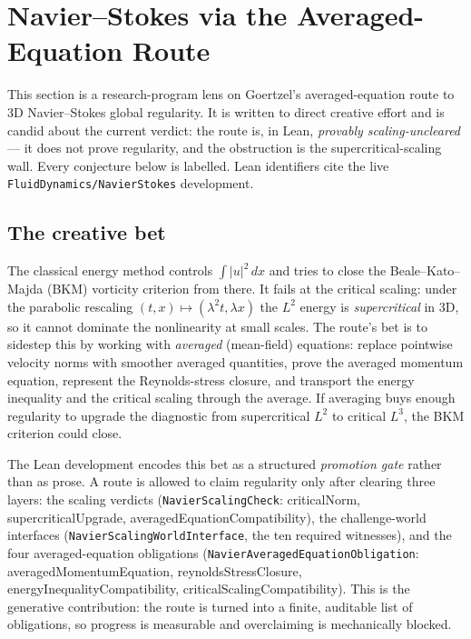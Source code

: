 \section{Navier--Stokes via the Averaged-Equation Route}
\label{sec:goertzel-ns-state}

This section is a research-program lens on Goertzel's averaged-equation route to
3D Navier--Stokes global regularity. It is written to direct creative effort and
is candid about the current verdict: the route is, in Lean, \emph{provably
scaling-uncleared} --- it does not prove regularity, and the obstruction is the
supercritical-scaling wall. Every conjecture below is labelled. Lean identifiers
cite the live \texttt{FluidDynamics/NavierStokes} development.

\subsection{The creative bet}

The classical energy method controls $\int|u|^2\,dx$ and tries to close the
Beale--Kato--Majda (BKM) vorticity criterion from there. It fails at the
critical scaling: under the parabolic rescaling $(t,x)\mapsto(\lambda^2 t,
\lambda x)$ the $L^2$ energy is \emph{supercritical} in 3D, so it cannot dominate
the nonlinearity at small scales. The route's bet is to sidestep this by working
with \emph{averaged} (mean-field) equations: replace pointwise velocity norms
with smoother averaged quantities, prove the averaged momentum equation,
represent the Reynolds-stress closure, and transport the energy inequality and
the critical scaling through the average. If averaging buys enough regularity to
upgrade the diagnostic from supercritical $L^2$ to critical $L^3$, the BKM
criterion could close.

The Lean development encodes this bet as a structured \emph{promotion gate}
rather than as prose. A route is allowed to claim regularity only after clearing
three layers: the scaling verdicts (\verb|NavierScalingCheck|: criticalNorm,
supercriticalUpgrade, averagedEquationCompatibility), the challenge-world
interfaces (\verb|NavierScalingWorldInterface|, the ten required witnesses), and
the four averaged-equation obligations (\verb|NavierAveragedEquationObligation|:
averagedMomentumEquation, reynoldsStressClosure, energyInequalityCompatibility,
criticalScalingCompatibility). This is the generative contribution: the route is
turned into a finite, auditable list of obligations, so progress is measurable
and overclaiming is mechanically blocked.

